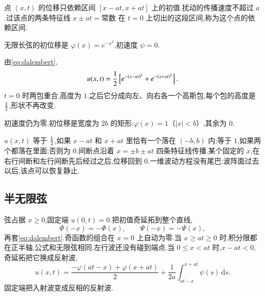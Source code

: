 点 $(x,t)$ 的位移只依赖区间 $[x-at,x+at]$ 上的初值.扰动的传播速度不超过 $a$.过该点的两条特征线 $x\pm at=\textrm{常数}$ 在 $t=0$ 上切出的这段区间,称为这个点的依赖区间.

\begin{example}
无限长弦的初位移是 $\varphi(x)=e^{-x^2}$,初速度 $\psi=0$.
\end{example}
\begin{solution}
由\eqref{eq:dalembert},
\begin{equation}
  u(x,t)={\frac{1}{2}}\left[e^{-(x-at)^2}+e^{-(x+at)^2}\right].
\end{equation}
$t=0$ 时两包重合,高度为 $1$.之后它分成向左、向右各一个高斯包,每个包的高度是 ${\frac{1}{2}}$,形状不再改变.
\end{solution}

\begin{example}
初速度仍为零,初位移是宽度为 $2b$ 的矩形:$\varphi(x)=1$（$|x|<b$）,其余为 $0$.
\end{example}
\begin{solution}
$u(x,t)$ 等于 ${\frac{1}{2}}$,如果 $x-at$ 和 $x+at$ 里恰有一个落在 $(-b,b)$ 内;等于 $1$,如果两个都落在里面;否则为 $0$.间断点沿着 $x=\pm b\pm at$ 四条特征线传播.某个固定的 $x$,在右行间断和左行间断先后经过之后,位移回到 $0$.一维波动方程没有尾巴:波阵面过去以后,该点可以恢复静止.
\end{solution}

\subsection{半无限弦}
弦占据 $x\geq 0$,固定端 $u(0,t)=0$.把初值奇延拓到整个直线,
\begin{equation}
  \Phi(-x)=-\Phi(x), \qquad \Psi(-x)=-\Psi(x),
\end{equation}
再套\eqref{eq:dalembert}.奇函数的组合在 $x=0$ 上自动为零.当 $x\geq at\geq 0$ 时,积分限都在正半轴,公式和无限弦相同,左行波还没有碰到端点.当 $0\leq x<at$ 时,$x-at<0$,奇延拓把它换成反射波,
\begin{equation}
  u(x,t)
  =\frac{-\varphi(at-x)+\varphi(x+at)}{2}
  +\frac{1}{2a}\int_{at-x}^{x+at}\psi(s)\,\mathrm{d}s.
\end{equation}
固定端把入射波变成反相的反射波.

